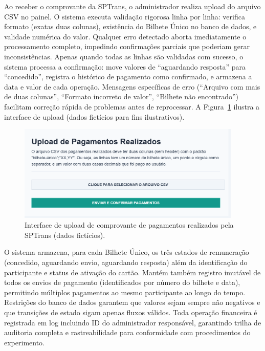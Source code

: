 Ao receber o comprovante da SPTrans,
o administrador realiza upload do arquivo CSV no painel. O sistema executa validação
rigorosa linha por linha: verifica formato (exatas duas colunas), existência do
Bilhete Único no banco de dados, e validade numérica do valor. Qualquer erro
detectado aborta imediatamente o processamento completo, impedindo confirmações
parciais que poderiam gerar inconsistências. Apenas quando todas as linhas são
validadas com sucesso, o sistema processa a confirmação: move valores de
``aguardando resposta'' para ``concedido'', registra o histórico de pagamento como confirmado, e armazena a data e valor de cada operação. Mensagens específicas de erro (``Arquivo com
mais de duas colunas'', ``Formato incorreto de valor'', ``Bilhete não encontrado'')
facilitam correção rápida de problemas antes de reprocessar. A Figura~\ref{fig:remuneracao_gerar_csv_form_processados} ilustra a interface de upload (dados fictícios para fins ilustrativos).

\begin{figure}[H]
    \centering
    \includegraphics[width=0.95\textwidth]{figuras/remuneracao_processados.png}
    \caption{Interface de upload de comprovante de pagamentos realizados pela SPTrans (dados fictícios).}
    \label{fig:remuneracao_gerar_csv_form_processados}
  \end{figure}
O sistema armazena, para cada Bilhete Único, os três estados de remuneração (concedido, aguardando envio, aguardando resposta) além da identificação do participante e status de ativação do cartão. Mantém também registro imutável de todos os envios de pagamento (identificados por número do bilhete e data), permitindo múltiplos pagamentos ao mesmo participante ao longo do tempo. Restrições do banco de dados garantem que valores sejam sempre não
negativos e que transições de estado sigam apenas fluxos
válidos. Toda operação financeira é registrada em log incluindo ID do administrador
responsável, garantindo trilha de auditoria completa e rastreabilidade para
conformidade com procedimentos do experimento.


